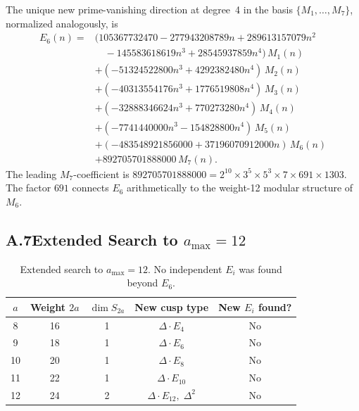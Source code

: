 The unique new prime-vanishing direction at degree~4 in the basis
$\{M_1,\dots,M_7\}$, normalized analogously, is
\begin{align*}
E_6(n) ={}
  &(105367732470 - 277943208789n + 289613157079n^2 \\
  &\quad{}-145583618619n^3+28545937859n^4)\,M_1(n)\\
  &+(-51324522800n^3+4292382480n^4)\,M_2(n)\\
  &+(-40313554176n^3+1776519808n^4)\,M_3(n)\\
  &+(-32888346624n^3+770273280n^4)\,M_4(n)\\
  &+(-7741440000n^3-154828800n^4)\,M_5(n)\\
  &+(-483548921856000+37196070912000n)\,M_6(n)\\
  &+892705701888000\,M_7(n).
\end{align*}
The leading $M_7$-coefficient is
$892705701888000 = 2^{10}\times 3^5\times 5^3\times 7\times 691\times 1303$.
The factor $691$ connects $E_6$ arithmetically to the weight-12 modular structure of
$M_6$.

\subsection*{A.7\quad Extended Search to $a_{\max}=12$}
\label{app:extended-search}

\begin{table}[H]
\centering
\caption{Extended search to $a_{\max}=12$.
         No independent $E_i$ was found beyond $E_6$.}
\label{tab:app-extended}
\begin{tabular}{@{}ccccc@{}}
\toprule
$a$ & Weight $2a$ & $\dim S_{2a}$ & New cusp type & New $E_i$ found? \\
\midrule
8  & 16 & 1 & $\Delta\cdot E_4$              & No \\
9  & 18 & 1 & $\Delta\cdot E_6$              & No \\
10 & 20 & 1 & $\Delta\cdot E_8$              & No \\
11 & 22 & 1 & $\Delta\cdot E_{10}$           & No \\
12 & 24 & 2 & $\Delta\cdot E_{12},\;\Delta^2$ & No \\
\bottomrule
\end{tabular}
\end{table}
